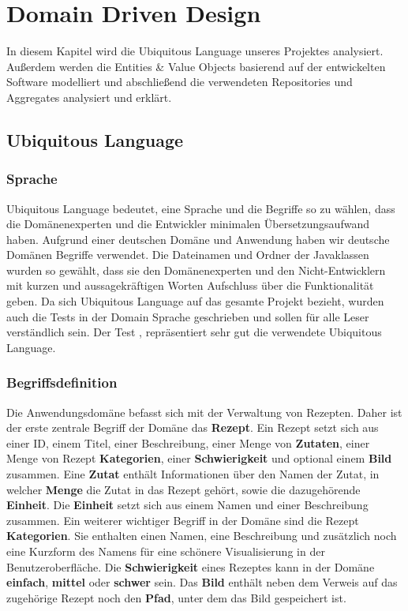 \chapter{Domain Driven Design}
In diesem Kapitel wird die Ubiquitous Language unseres Projektes analysiert. Außerdem werden die Entities \& Value Objects basierend auf der entwickelten Software modelliert und abschließend die verwendeten Repositories und Aggregates analysiert und erklärt.
\section{Ubiquitous Language}
\subsection{Sprache}
Ubiquitous Language  bedeutet, eine Sprache und die Begriffe so zu wählen, dass die Domänenexperten und die Entwickler minimalen Übersetzungsaufwand haben.  Aufgrund einer deutschen Domäne und Anwendung haben wir deutsche Domänen Begriffe verwendet.
Die Dateinamen und Ordner der Javaklassen wurden so gewählt, dass sie den Domänenexperten und den Nicht-Entwicklern mit kurzen und aussagekräftigen Worten Aufschluss über die Funktionalität geben.
Da sich Ubiquitous Language  auf das gesamte Projekt bezieht, wurden auch die Tests in der Domain Sprache geschrieben und sollen für alle Leser verständlich sein. Der Test \href{https://github.com/MichaelaHaag/RezeptApp/blob/main/3-Domain-Code/src/test/java/de/rezeptapp/domain/Rezept/RezeptRepositoryTest.java}{}, repräsentiert sehr gut die verwendete Ubiquitous Language.
\subsection{Begriffsdefinition}
Die Anwendungsdomäne befasst sich mit der Verwaltung von Rezepten. Daher ist der erste zentrale Begriff der Domäne das \textbf{Rezept}. Ein Rezept setzt sich aus einer ID, einem Titel, einer Beschreibung, einer Menge von \textbf{Zutaten}, einer Menge von Rezept \textbf{Kategorien}, einer \textbf{Schwierigkeit} und optional einem \textbf{Bild} zusammen. Eine \textbf{Zutat} enthält Informationen über den Namen der Zutat, in welcher \textbf{Menge} die Zutat in das Rezept gehört, sowie die dazugehörende \textbf{Einheit}. Die \textbf{Einheit} setzt sich aus einem Namen und einer Beschreibung zusammen.
Ein weiterer wichtiger Begriff in der Domäne sind die Rezept \textbf{Kategorien}. Sie enthalten einen Namen, eine Beschreibung und zusätzlich noch eine Kurzform des Namens für eine schönere Visualisierung in der Benutzeroberfläche.
Die \textbf{Schwierigkeit} eines Rezeptes kann in der Domäne \textbf{einfach}, \textbf{mittel} oder \textbf{schwer} sein. Das \textbf{Bild} enthält neben dem Verweis auf das zugehörige Rezept noch den \textbf{Pfad}, unter dem das Bild gespeichert ist.
